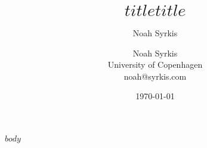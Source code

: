 \documentclass[11pt]{article} %
\title{$title$}
\author{Noah Syrkis}
\date{\today}
\title{$title$}
\author{Noah Syrkis \\ University of Copenhagen \\ noah@syrkis.com}
\date{}
\begin{document}
\maketitle %
\begin{multicols}{2}
  $body$
\end{multicols}
\printbibliography %
\end{document}
